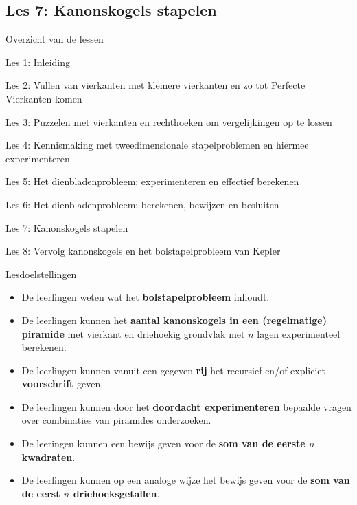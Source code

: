 \documentclass[dutch]{beamer}
\begin{document}
\subsection{Les 7: Kanonskogels stapelen}
\begin{frame}
{Overzicht van de lessen}
\begin{list}{\quad}{}
\item Les 1: Inleiding
\item Les 2: Vullen van vierkanten met kleinere vierkanten en zo tot Perfecte Vierkanten komen
\item Les 3: Puzzelen met vierkanten en rechthoeken om vergelijkingen op te lossen
\item Les 4: Kennismaking met tweedimensionale stapelproblemen en hiermee experimenteren
\item Les 5: Het dienbladenprobleem: experimenteren en effectief berekenen
\item Les 6: Het dienbladenprobleem: berekenen, bewijzen en besluiten
\item {\color{blue}Les 7: Kanonskogels stapelen}
\item Les 8: Vervolg kanonskogels en het bolstapelprobleem van Kepler
\end{list}
\end{frame}

\begin{frame}{Lesdoelstellingen}
\begin{itemize}
\item De leerlingen weten wat het \textbf{bolstapelprobleem} inhoudt.
\item De leerlingen kunnen het \textbf{aantal kanonskogels in een (regelmatige) piramide} met vierkant en driehoekig grondvlak met $n$ lagen experimenteel berekenen.
\item De leerlingen kunnen vanuit een gegeven \textbf{rij} het recursief en/of expliciet \textbf{voorschrift} geven.
\item De leerlingen kunnen door het \textbf{doordacht experimenteren} bepaalde vragen over combinaties van piramides onderzoeken.
\item De leeringen kunnen een bewijs geven voor de \textbf{som van de eerste $n$ kwadraten}.
\item De leerlingen kunnen op een analoge wijze het bewijs geven voor de \textbf{som van de eerst $n$ driehoeksgetallen}.
\end{itemize}
\end{frame}
\end{document}
